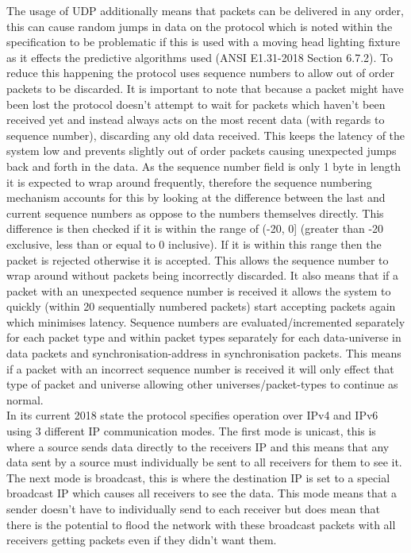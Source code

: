 \documentclass[11pt,a4paper]{article}
\begin{document}
The usage of UDP additionally means that packets can be delivered in any order, this can cause random jumps in data on the protocol which is noted within the specification to be problematic if this is used with a moving head lighting fixture as it effects the predictive algorithms used (ANSI E1.31-2018 Section 6.7.2). To reduce this happening the protocol uses sequence numbers to allow out of order packets to be discarded. It is important to note that because a packet might have been lost the protocol doesn't attempt to wait for packets which haven't been received yet and instead always acts on the most recent data (with regards to sequence number), discarding any old data received. This keeps the latency of the system low and prevents slightly out of order packets causing unexpected jumps back and forth in the data. As the sequence number field is only 1 byte in length it is expected to wrap around frequently, therefore the sequence numbering mechanism accounts for this by looking at the difference between the last and current sequence numbers as oppose to the numbers themselves directly. This difference is then checked if it is within the range of (-20, 0] (greater than -20 exclusive, less than or equal to 0 inclusive). If it is within this range then the packet is rejected otherwise it is accepted. This allows the sequence number to wrap around without packets being incorrectly discarded. It also means that if a packet with an unexpected sequence number is received it allows the system to quickly (within 20 sequentially numbered packets) start accepting packets again which minimises latency. Sequence numbers are evaluated/incremented separately for each packet type and within packet types separately for each data-universe in data packets and synchronisation-address in synchronisation packets. This means if a packet with an incorrect sequence number is received it will only effect that type of packet and universe allowing other universes/packet-types to continue as normal.\\

In its current 2018 state the protocol specifies operation over IPv4 and IPv6 using 3 different IP communication modes. The first mode is unicast, this is where a source sends data directly to the receivers IP and this means that any data sent by a source must individually be sent to all receivers for them to see it. The next mode is broadcast, this is where the destination IP is set to a special broadcast IP which causes all receivers to see the data. This mode means that a sender doesn't have to individually send to each receiver but does mean that there is the potential to flood the network with these broadcast packets with all receivers getting packets even if they didn't want them.\\
\end{document}
